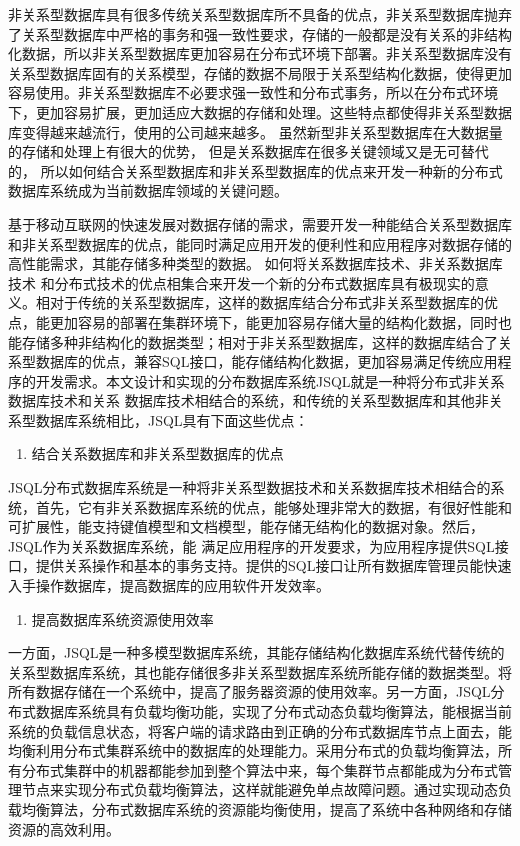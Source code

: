非关系型数据库具有很多传统关系型数据库所不具备的优点，非关系型数据库抛弃了关系型数据库中严格的事务和强一致性要求，存储的一般都是没有关系的非结构化数据，所以非关系型数据库更加容易在分布式环境下部署。非关系型数据库没有关系型数据库固有的关系模型，存储的数据不局限于关系型结构化数据，使得更加容易使用。非关系型数据库不必要求强一致性和分布式事务，所以在分布式环境下，更加容易扩展，更加适应大数据的存储和处理。这些特点都使得非关系型数据库变得越来越流行，使用的公司越来越多。
虽然新型非关系型数据库在大数据量的存储和处理上有很大的优势，
但是关系数据库在很多关键领域又是无可替代的，
所以如何结合关系型数据库和非关系型数据库的优点来开发一种新的分布式数据库系统成为当前数据库领域的关键问题。

基于移动互联网的快速发展对数据存储的需求，需要开发一种能结合关系型数据库和非关系型数据库的优点，能同时满足应用开发的便利性和应用程序对数据存储的高性能需求，其能存储多种类型的数据。
如何将关系数据库技术、非关系数据库技术
和分布式技术的优点相集合来开发一个新的分布式数据库具有极现实的意义。相对于传统的关系型数据库，这样的数据库结合分布式非关系型数据库的优点，能更加容易的部署在集群环境下，能更加容易存储大量的结构化数据，同时也能存储多种非结构化的数据类型；相对于非关系型数据库，这样的数据库结合了关系型数据库的优点，兼容SQL接口，能存储结构化数据，更加容易满足传统应用程序的开发需求。本文设计和实现的分布数据库系统JSQL就是一种将分布式非关系数据库技术和关系
数据库技术相结合的系统，和传统的关系型数据库和其他非关系型数据库系统相比，JSQL具有下面这些优点：

\begin{enumerate}
	\item 结合关系数据库和非关系型数据库的优点
\end{enumerate}

	JSQL分布式数据库系统是一种将非关系型数据技术和关系数据库技术相结合的系统，首先，它有非关系数据库系统的优点，能够处理非常大的数据，有很好性能和可扩展性，能支持键值模型和文档模型，能存储无结构化的数据对象。然后，JSQL作为关系数据库系统，能
	满足应用程序的开发要求，为应用程序提供SQL接口，提供关系操作和基本的事务支持。提供的SQL接口让所有数据库管理员能快速入手操作数据库，提高数据库的应用软件开发效率。
	
	\begin{enumerate}[resume]
		\item 提高数据库系统资源使用效率
	\end{enumerate}

一方面，JSQL是一种多模型数据库系统，其能存储结构化数据库系统代替传统的关系型数据库系统，其也能存储很多非关系型数据库系统所能存储的数据类型。将所有数据存储在一个系统中，提高了服务器资源的使用效率。另一方面，JSQL分布式数据库系统具有负载均衡功能，实现了分布式动态负载均衡算法，能根据当前系统的负载信息状态，将客户端的请求路由到正确的分布式数据库节点上面去，能均衡利用分布式集群系统中的数据库的处理能力。采用分布式的负载均衡算法，所有分布式集群中的机器都能参加到整个算法中来，每个集群节点都能成为分布式管理节点来实现分布式负载均衡算法，这样就能避免单点故障问题。通过实现动态负载均衡算法，分布式数据库系统的资源能均衡使用，提高了系统中各种网络和存储资源的高效利用。
	
